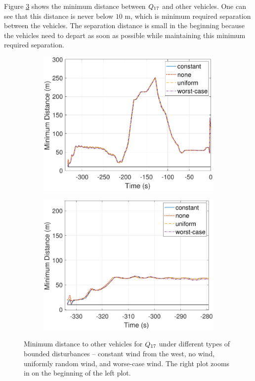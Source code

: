 Figure \ref{fig:min_dists} shows the minimum distance between $Q_{17}$ and other vehicles. One can see that this distance is never below $10$ m, which is minimum required separation between the vehicles. The separation distance is small in the beginning because the vehicles need to depart as soon as possible while maintaining this minimum required separation. 

\begin{figure}[!htb]
  \centering
  \begin{subfigure}{0.5\textwidth}
    \includegraphics[width=\columnwidth]{figs/min_dists}
    \subcaption{}
    \label{fig:min_dists_s1}
  \end{subfigure}%
  \begin{subfigure}{0.5\textwidth}
    \includegraphics[width=\columnwidth]{figs/min_dists_zoomed_in}
    \subcaption{}
    \label{fig:min_dists_s2}
  \end{subfigure}%
  
  \caption{Minimum distance to other vehicles for $Q_{17}$ under different types of bounded disturbances -- constant wind from the west, no wind, uniformly random wind, and worse-case wind. The right plot zooms in on the beginning of the left plot.}
  \label{fig:min_dists}
\end{figure}

